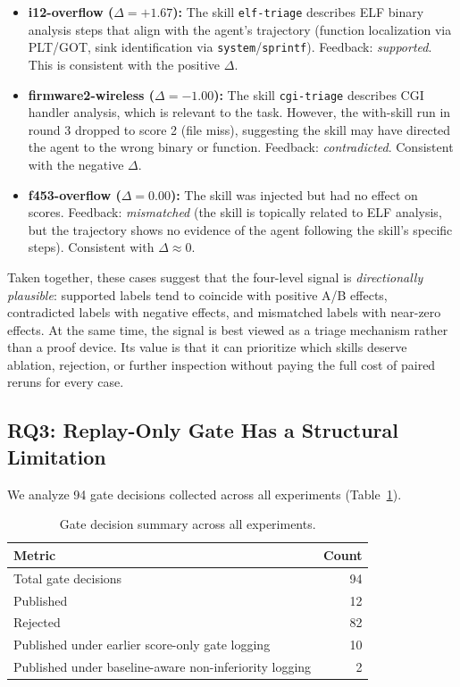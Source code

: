 ﻿\documentclass[preprint,12pt]{elsarticle}
\begin{document}
\begin{itemize}[leftmargin=*]
    \item \textbf{i12-overflow ($\Delta = +1.67$):} The skill
    \texttt{elf-triage} describes ELF binary analysis
    steps that align with the agent's trajectory (function localization
    via PLT/GOT, sink identification via \texttt{system}/\texttt{sprintf}).
    Feedback: \emph{supported}.  This is consistent with the positive
    $\Delta$.
    \item \textbf{firmware2-wireless ($\Delta = -1.00$):} The skill
    \texttt{cgi-triage} describes CGI handler
    analysis, which is relevant to the task.  However, the with-skill run
    in round 3 dropped to score 2 (file miss), suggesting the skill may
    have directed the agent to the wrong binary or function.  Feedback:
    \emph{contradicted}.  Consistent with the negative $\Delta$.
    \item \textbf{f453-overflow ($\Delta = 0.00$):} The skill was injected
    but had no effect on scores.  Feedback: \emph{mismatched} (the skill
    is topically related to ELF analysis, but the trajectory shows no
    evidence of the agent following the skill's specific steps).
    Consistent with $\Delta \approx 0$.
\end{itemize}

Taken together, these cases suggest that the four-level signal is
\emph{directionally plausible}: supported labels tend to coincide with
positive A/B effects, contradicted labels with negative effects, and
mismatched labels with near-zero effects.  At the same time, the signal is
best viewed as a triage mechanism rather than a proof device.  Its value is
that it can prioritize which skills deserve ablation, rejection, or further
inspection without paying the full cost of paired reruns for every case.

\subsection{RQ3: Replay-Only Gate Has a Structural Limitation}
\label{sec:results_gate}

We analyze 94 gate decisions collected across all experiments
(Table~\ref{tab:gate_stats}).

\begin{table}[t]
\centering
\caption{Gate decision summary across all experiments.}
\label{tab:gate_stats}
\small
\begin{tabular}{lr}
\toprule
Metric & Count \\
\midrule
Total gate decisions & 94 \\
Published & 12 \\
Rejected & 82 \\
Published under earlier score-only gate logging & 10 \\
Published under baseline-aware non-inferiority logging & 2 \\
\bottomrule
\end{tabular}
\end{table}
\end{document}
